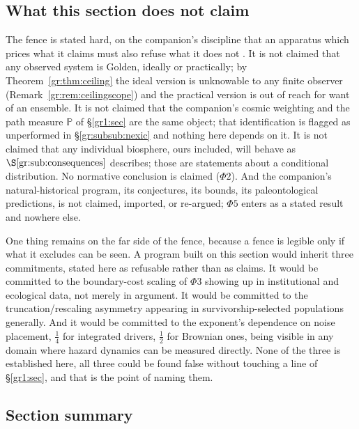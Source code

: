 \documentclass[11pt]{article}
\numberwithin{equation}{section}
\theoremstyle{plain}
\theoremstyle{definition}
\theoremstyle{remark}
\newcommand{\PP}{\mathbb{P}}
\begin{document}
\subsection{What this section does not claim}\label{gr:sub:fence}

The fence is stated hard, on the companion's discipline that an
apparatus which prices what it claims must also refuse what it does not
\cite{Ben26Optimal}. It is not claimed that any observed system is Golden, ideally or
practically; by Theorem~\ref{gr:thm:ceiling} the ideal version is
unknowable to any finite observer (Remark~\ref{gr:rem:ceilingscope}) and
the practical version is out of reach for want of an ensemble. It is not claimed that the companion's cosmic
weighting and the path measure $\PP$ of
\S\ref{gr1:sec} are the same object; that
identification is flagged as unperformed in
\S\ref{gr:subsub:nexic} and nothing here depends on it. It is not
claimed that any individual biosphere, ours included, will behave as
$\S\ref{gr:sub:consequences}$ describes; those are statements about a
conditional distribution. No normative conclusion is claimed
($\Phi2$). And the companion's natural-historical program, its
conjectures, its bounds, its paleontological predictions, is not
claimed, imported, or re-argued; $\Phi5$ enters as a stated result and
nowhere else.

One thing remains on the far side of the fence, because a fence is
legible only if what it excludes can be seen. A program built on this
section would inherit three commitments, stated here as refusable rather
than as claims. It would be committed to the boundary-cost scaling of
$\Phi3$ showing up in institutional and ecological data, not merely in
argument. It would be committed to the truncation/rescaling asymmetry
appearing in survivorship-selected populations generally. And it would
be committed to the exponent's dependence on noise placement, $\tfrac14$
for integrated drivers, $\tfrac12$ for Brownian ones, being visible
in any domain where hazard dynamics can be measured directly. None of
the three is established here, all three could be found false without
touching a line of \S\ref{gr1:sec}, and that is the
point of naming them.

\subsection{Section summary}\label{gr:sub:summary}
\end{document}

